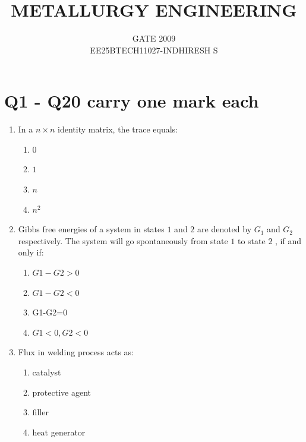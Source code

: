 \documentclass[journal]{IEEEtran}
\theoremstyle{remark}
\begin{document}

\onecolumn

\title{METALLURGY ENGINEERING}
\author{GATE 2009\\
EE25BTECH11027-INDHIRESH S}
\maketitle


\renewcommand{\thefigure}{\theenumi}
\renewcommand{\thetable}{\theenumi}

\section{Q1 - Q20 carry one mark each}
\begin{enumerate}
\item  In a $n\times n $ identity matrix, the trace equals: \hfill{}

\begin{multicols}{4}
\begin{enumerate}
\item $0$
\item $1$
\item $n$
\item $n^2$
\end{enumerate}
\end{multicols}

\item  Gibbs free energies of a system in states $1$ and $2$ are denoted by $G_1$ and $G_2$ respectively. The system will go spontaneously from state $1$ to state $2$ , if and only if: \hfill{}
\begin{multicols}{4}
\begin{enumerate}
\item $G1-G2>0$
\item $G1-G2<0$
\item G1-G2=0
\item $G1<0 , G2<0$
\end{enumerate}
\end{multicols}

\item Flux in welding process acts as:
\hfill{}
\begin{multicols}{2}
\begin{enumerate}
\item catalyst
\item protective agent
\item filler
\item heat generator
\end{enumerate}
\end{multicols}


\end{enumerate}
\end{document}
